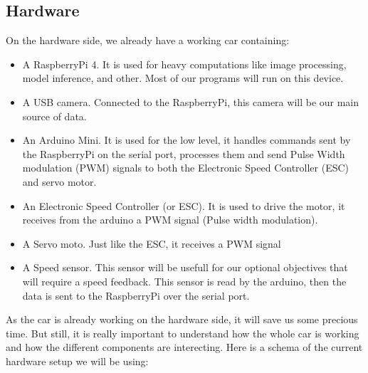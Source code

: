 \documentclass[12pt]{article}
\begin{document}
\subsection{Hardware}
On the hardware side, we already have a working car containing:
\begin{itemize}
\item A RaspberryPi 4. It is used for heavy computations like image processing, model inference, and other. Most of our programs will run on this device.
\item A USB camera. Connected to the RaspberryPi, this camera will be our main source of data.
\item An Arduino Mini. It is used for the low level, it handles commands sent by the RaspberryPi on the serial port, processes them and send Pulse Width modulation (PWM) signals to both the Electronic Speed Controller (ESC) and servo motor.
\item An Electronic Speed Controller (or ESC). It is used to drive the motor, it receives  from the arduino a PWM signal (Pulse width modulation).
\item A Servo moto. Just like the ESC, it receives a PWM signal
\item A Speed sensor. This sensor will be usefull for our optional objectives that will require a speed feedback. This sensor is read by the arduino, then the data is sent to the RaspberryPi over the serial port.
\end{itemize}

As the car is already working on the hardware side, it will save us some precious time. But still, it is really important to understand how the whole car is working and how the different components are interecting.
Here is a schema of the current hardware setup we will be using:
\newpage

\end{document}

